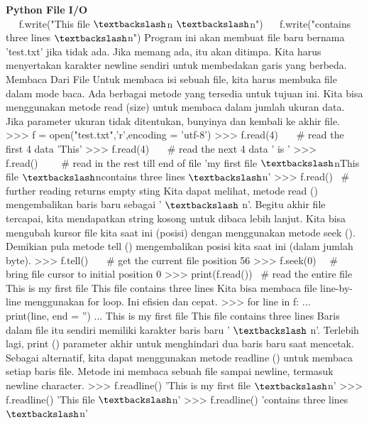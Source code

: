 \begin{center}{\fontsize{24pt}{24pt}\selectfont \textbf{Python File I/O} \\}
~~ f.write("This file $  \textbackslash  $n $  \textbackslash  $n") 
~~ f.write("contains three lines $  \textbackslash  $n") 
Program ini akan membuat file baru bernama 'test.txt' jika tidak ada. Jika memang ada, itu akan ditimpa.
Kita harus menyertakan karakter newline sendiri untuk membedakan garis yang berbeda. 
Membaca Dari File
Untuk membaca isi sebuah file, kita harus membuka file dalam mode baca. 
Ada berbagai metode yang tersedia untuk tujuan ini. Kita bisa menggunakan metode read (size) untuk membaca dalam jumlah ukuran data. Jika parameter ukuran tidak ditentukan, bunyinya dan kembali ke akhir file.
>>> f = open("test.txt",'r',encoding = 'utf-8')
>>> f.read(4)~~~  $  \#  $ read the first 4 data 
'This' 
>>> f.read(4)~~~  $  \#  $ read the next 4 data
' is ' 
>>> f.read()~~~~  $  \#  $ read in the rest till end of file 
'my first file $  \textbackslash  $nThis file $  \textbackslash  $ncontains three lines $  \textbackslash  $n' 
>>> f.read()~  $  \#  $ further reading returns empty sting 
Kita dapat melihat, metode read () mengembalikan baris baru sebagai ' $  \textbackslash  $ n'. Begitu akhir file tercapai, kita mendapatkan string kosong untuk dibaca lebih lanjut. 
Kita bisa mengubah kursor file kita saat ini (posisi) dengan menggunakan metode seek (). Demikian pula metode tell () mengembalikan posisi kita saat ini (dalam jumlah byte). 
>>> f.tell()~~~  $  \#  $ get the current file position 
56 
>>> f.seek(0)~~  $  \#  $ bring file cursor to initial position 
0 
>>> print(f.read())~  $  \#  $ read the entire file 
This is my first file 
This file
contains three lines 
Kita bisa membaca file line-by-line menggunakan for loop. Ini efisien dan cepat. 
>>> for line in f: 
...~~~~ print(line, end = '') 
...  
This is my first file 
This file 
contains three lines 
Baris dalam file itu sendiri memiliki karakter baris baru ' $  \textbackslash  $ n'.
Terlebih lagi, print () parameter akhir untuk menghindari dua baris baru saat mencetak. 
Sebagai alternatif, kita dapat menggunakan metode readline () untuk membaca setiap baris file. Metode ini membaca sebuah file sampai newline, termasuk newline character.
>>> f.readline() 
'This is my first file $  \textbackslash  $n' 
>>> f.readline()
'This file $  \textbackslash  $n' 
>>> f.readline() 
'contains three lines $  \textbackslash  $n' 


\end{center}
